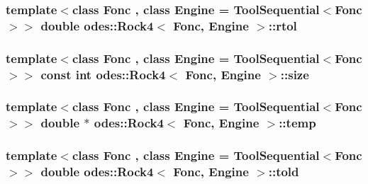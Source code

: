 \hypertarget{classodes_1_1Rock4_a358756fc102debb458cd1351efb38ddc}{
\subsubsection[{rtol}]{\setlength{\rightskip}{0pt plus 5cm}template$<$class Fonc , class Engine  = Tool\-Sequential$<$\-Fonc$>$$>$ double {\bf odes\-::\-Rock4}$<$ Fonc, Engine $>$\-::rtol\hspace{0.3cm}{\ttfamily [private]}}}\label{classodes_1_1Rock4_a358756fc102debb458cd1351efb38ddc}
\hypertarget{classodes_1_1Rock4_a92fce238f76152ab800a70c283eaec8a}{
\subsubsection[{size}]{\setlength{\rightskip}{0pt plus 5cm}template$<$class Fonc , class Engine  = Tool\-Sequential$<$\-Fonc$>$$>$ const int {\bf odes\-::\-Rock4}$<$ Fonc, Engine $>$\-::size\hspace{0.3cm}{\ttfamily [private]}}}\label{classodes_1_1Rock4_a92fce238f76152ab800a70c283eaec8a}
\hypertarget{classodes_1_1Rock4_ac57b7b19f52d5eacb83a6a0fdf8013a1}{
\subsubsection[{temp}]{\setlength{\rightskip}{0pt plus 5cm}template$<$class Fonc , class Engine  = Tool\-Sequential$<$\-Fonc$>$$>$ double $\ast$ {\bf odes\-::\-Rock4}$<$ Fonc, Engine $>$\-::temp\hspace{0.3cm}{\ttfamily [private]}}}\label{classodes_1_1Rock4_ac57b7b19f52d5eacb83a6a0fdf8013a1}
\hypertarget{classodes_1_1Rock4_a2a2c392ee50d2a4e044d0f4283af3480}{
\subsubsection[{told}]{\setlength{\rightskip}{0pt plus 5cm}template$<$class Fonc , class Engine  = Tool\-Sequential$<$\-Fonc$>$$>$ double {\bf odes\-::\-Rock4}$<$ Fonc, Engine $>$\-::told\hspace{0.3cm}{\ttfamily [private]}}}\label{classodes_1_1Rock4_a2a2c392ee50d2a4e044d0f4283af3480}
